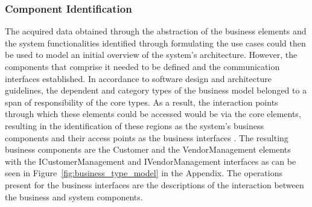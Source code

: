\subsubsection{Component Identification}
The acquired data obtained through the abstraction of the business elements and the system functionalities identified through formulating the use cases could then be used to model an initial overview of the system's architecture. However, the components that comprise it needed to be defined and the communication interfaces established. In accordance to software design and architecture guidelines, the dependent and category types of the business model belonged to a span of responsibility of the core types. As a result, the interaction points through which these elements could be accessed would be via the core elements, resulting in the identification of these regions as the system's business components and their access points as the business interfaces \cite{hamza_2017}. The resulting business components are the Customer and the VendorManagement elements with the ICustomerManagement and IVendorManagement interfaces as can be seen in Figure~\ref{fig:business_type_model} in the Appendix. The operations present for the business interfaces are the descriptions of the interaction between the business and system components.\\

